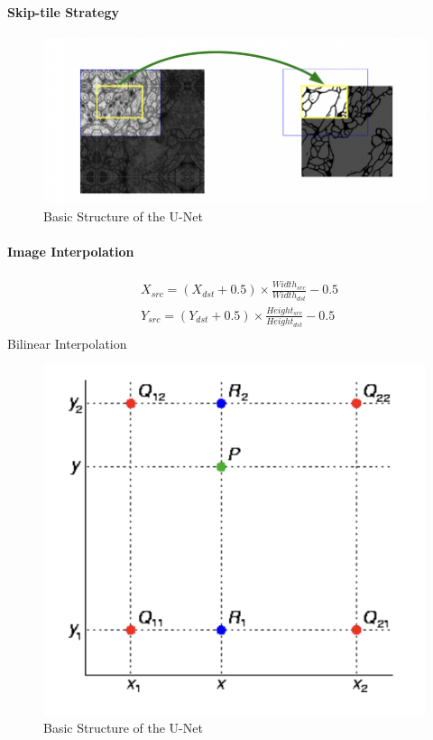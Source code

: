 \documentclass{article}
\begin{document}
\paragraph{Skip-tile Strategy}
\begin{figure}[htp]
    \centering
    \includegraphics[scale = 0.5]{Figures/Skip-tile.png}
   \caption{Basic Structure of the U-Net}
\end{figure}

\paragraph{Image Interpolation}
\begin{align*}
    & X_{src} = (X_{dst} + 0.5) \times \frac{Width_{src}}{Width_{dst}} - 0.5 \\
    & Y_{src} = (Y_{dst} + 0.5) \times \frac{Height_{src}}{Height_{dst}} - 0.5 \\
\end{align*}
Bilinear Interpolation
\begin{figure}[htp]
    \centering
    \includegraphics[scale = 0.5]{Figures/Bilinear Interpolation.png}
   \caption{Basic Structure of the U-Net}
\end{figure}
\end{document}
